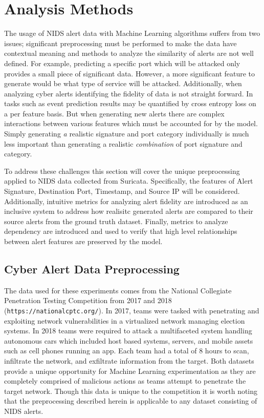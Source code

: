 \chapter{Analysis Methods}


The usage of NIDS alert data with Machine Learning algorithms suffers from two issues; significant preprocessing must be performed to make the data have contextual meaning and methods to analyze the similarity of alerts are not well defined. For example, predicting a specific port which will be attacked only provides a small piece of significant data. However, a more significant feature to generate would be what type of service will be attacked. Additionally, when analyzing cyber alerts identifying the fidelity of data is not straight forward. In tasks such as event prediction results may be quantified by cross entropy loss on a per feature basis. But when generating new alerts there are complex interactions between various features which must be accounted for by the model. Simply generating \emph{a} realistic signature and port category individually is much less important than generating a realistic \emph{combination} of port signature and category. 

To address these challenges this section will cover the unique preprocessing applied to NIDS data collected from Suricata. Specifically, the features of Alert Signature, Destination Port, Timestamp, and Source IP will be considered. Additionally, intuitive metrics for analyzing alert fidelity are introduced as an inclusive system to address how realisitc generated alerts are compared to their source alerts from the ground truth dataset. Finally, metrics to analyze dependency are introduced and used to verify that high level relationships between alert features are preserved by the model.


\section{Cyber Alert Data Preprocessing}

The data used for these experiments comes from the National Collegiate Penetration Testing Competition from 2017 and 2018 (\texttt{https://nationalcptc.org/}). In 2017, teams were tasked with penetrating and exploiting network vulnerabilities in a virtualized network managing election systems. In 2018 teams were required to attack a multifaceted system handling autonomous cars which included host based systems, servers, and mobile assets such as cell phones running an app. Each team had a total of 8 hours to scan, infiltrate the network, and exfiltrate information from the target. Both datasets provide a unique opportunity for Machine Learning experimentation as they are completely comprised of malicious actions as teams attempt to penetrate the target network. Though this data is unique to the competition it is worth noting that the preprocessing described herein is applicable to any dataset consisting of NIDS alerts.  

